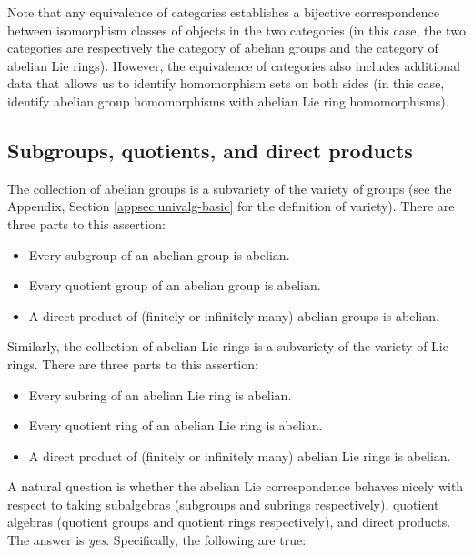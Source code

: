 Note that any equivalence of categories establishes a bijective
correspondence between isomorphism classes of objects in the two
categories (in this case, the two categories are respectively the
category of abelian groups and the category of abelian Lie
rings). However, the equivalence of categories also includes
additional data that allows us to identify homomorphism sets on both
sides (in this case, identify abelian group homomorphisms with abelian
Lie ring homomorphisms).

\subsection{Subgroups, quotients, and direct products}\label{sec:abelian-lie-correspondence-sub-quot-dp}

The collection of abelian groups is a subvariety of the variety of
groups (see the Appendix, Section \ref{appsec:univalg-basic} for the
definition of variety). There are three parts to this assertion:

\begin{itemize}
\item Every subgroup of an abelian group is abelian.
\item Every quotient group of an abelian group is abelian.
\item A direct product of (finitely or infinitely many) abelian groups
  is abelian.
\end{itemize}

Similarly, the collection of abelian Lie rings is a subvariety of the
variety of Lie rings. There are three parts to this assertion:

\begin{itemize}
\item Every subring of an abelian Lie ring is abelian.
\item Every quotient ring of an abelian Lie ring is abelian.
\item A direct product of (finitely or infinitely many) abelian Lie
  rings is abelian.
\end{itemize}

A natural question is whether the abelian Lie correspondence behaves
nicely with respect to taking subalgebras (subgroups and subrings
respectively), quotient algebras (quotient groups and quotient rings
respectively), and direct products. The answer is {\em
  yes}. Specifically, the following are true:

